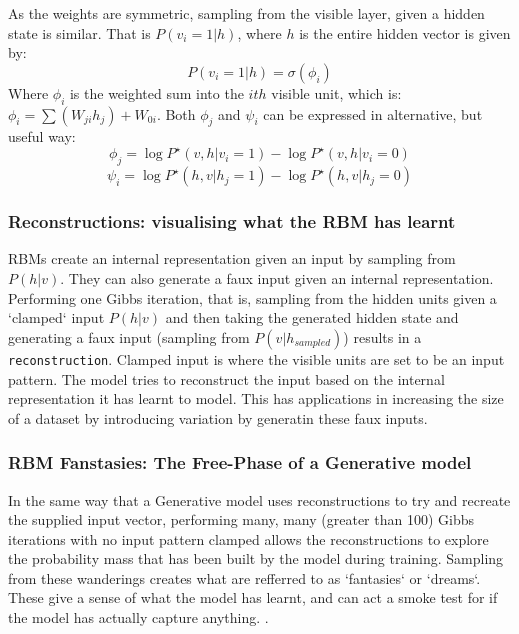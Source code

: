     As the weights are symmetric, sampling from the visible layer, given a hidden state is similar. That is $P(v_i = 1 | h)$, where $h$ is the entire hidden vector is given by:
    \begin{equation}\label{eq:Vis-Gibbs-Update}
     P(v_i = 1 | h) = \sigma(\phi_{i})
    \end{equation}
    Where $\phi_i$ is the weighted sum into the $ith$ visible unit, which is: $ \phi_i = \sum(W_{ji}h_{j}) + W_{0i} $. Both $\phi_j$ and $\psi_i$ can be expressed in alternative, but useful way:
    \begin{equation}
    \phi_j = \log P^\star(v,h | v_i = 1) - \log P^\star(v,h | v_i = 0)
    \end{equation}
    \begin{equation}\label{psi-gibbs-update-rbm}
    \psi_i = \log P^\star(h,v | h_j = 1) - \log P^\star(h,v | h_j = 0)
    \end{equation}



\subsubsection{Reconstructions: visualising what the RBM has learnt}

RBMs create an internal representation given an input by sampling from $P(h|v)$. They can also generate a faux input given an internal representation. Performing one Gibbs iteration, that is, sampling from the hidden units given a `clamped` input $ P(h|v) $ and then taking the generated hidden state and generating a faux input (sampling from $P(v|h_{sampled})$) results in a \texttt{reconstruction}. Clamped input is where the visible units are set to be an input pattern. The model tries to reconstruct the input based on the internal representation it has learnt to model. This has applications in increasing the size of a dataset by introducing variation by generatin these faux inputs\todocite{}.

\subsubsection{RBM Fanstasies: The Free-Phase of a Generative model}

In the same way that a Generative model uses reconstructions to try and recreate the supplied input vector, performing many, many (greater than 100) Gibbs iterations with no input pattern clamped allows the reconstructions to explore the probability mass that has been built by the model during training. Sampling from these wanderings creates what are refferred to as `fantasies` or `dreams`. These give a sense of what the model has learnt, and can act a smoke test for if the model has actually capture anything.
.

